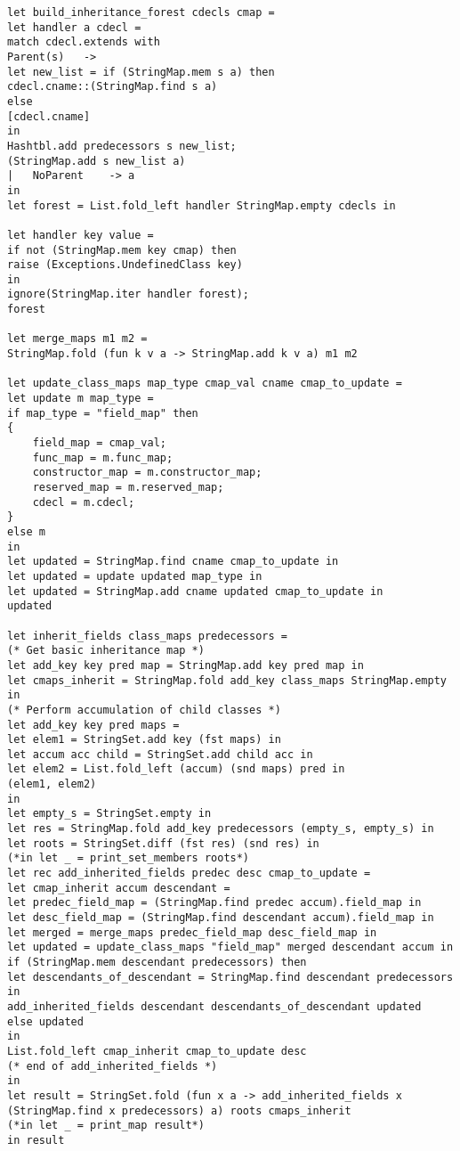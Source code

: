 \begin{verbatim}
let build_inheritance_forest cdecls cmap = 
let handler a cdecl =
match cdecl.extends with 
Parent(s) 	-> 
let new_list = if (StringMap.mem s a) then
cdecl.cname::(StringMap.find s a)
else
[cdecl.cname]
in
Hashtbl.add predecessors s new_list; 
(StringMap.add s new_list a) 
| 	NoParent 	-> a
in
let forest = List.fold_left handler StringMap.empty cdecls in

let handler key value = 
if not (StringMap.mem key cmap) then 
raise (Exceptions.UndefinedClass key)
in
ignore(StringMap.iter handler forest);
forest

let merge_maps m1 m2 = 
StringMap.fold (fun k v a -> StringMap.add k v a) m1 m2

let update_class_maps map_type cmap_val cname cmap_to_update = 
let update m map_type = 
if map_type = "field_map" then
{
	field_map = cmap_val;
	func_map = m.func_map;
	constructor_map = m.constructor_map;
	reserved_map = m.reserved_map;
	cdecl = m.cdecl;
}
else m
in
let updated = StringMap.find cname cmap_to_update in
let updated = update updated map_type in
let updated = StringMap.add cname updated cmap_to_update in
updated

let inherit_fields class_maps predecessors =
(* Get basic inheritance map *)
let add_key key pred map = StringMap.add key pred map in
let cmaps_inherit = StringMap.fold add_key class_maps StringMap.empty in
(* Perform accumulation of child classes *)
let add_key key pred maps = 
let elem1 = StringSet.add key (fst maps) in
let accum acc child = StringSet.add child acc in
let elem2 = List.fold_left (accum) (snd maps) pred in
(elem1, elem2)
in
let empty_s = StringSet.empty in
let res = StringMap.fold add_key predecessors (empty_s, empty_s) in
let roots = StringSet.diff (fst res) (snd res) in
(*in let _ = print_set_members roots*)
let rec add_inherited_fields predec desc cmap_to_update = 
let cmap_inherit accum descendant = 
let predec_field_map = (StringMap.find predec accum).field_map in
let desc_field_map = (StringMap.find descendant accum).field_map in 
let merged = merge_maps predec_field_map desc_field_map in 
let updated = update_class_maps "field_map" merged descendant accum in
if (StringMap.mem descendant predecessors) then 
let descendants_of_descendant = StringMap.find descendant predecessors in
add_inherited_fields descendant descendants_of_descendant updated 
else updated
in
List.fold_left cmap_inherit cmap_to_update desc
(* end of add_inherited_fields *)
in 
let result = StringSet.fold (fun x a -> add_inherited_fields x (StringMap.find x predecessors) a) roots cmaps_inherit
(*in let _ = print_map result*)
in result


\end{verbatim}
